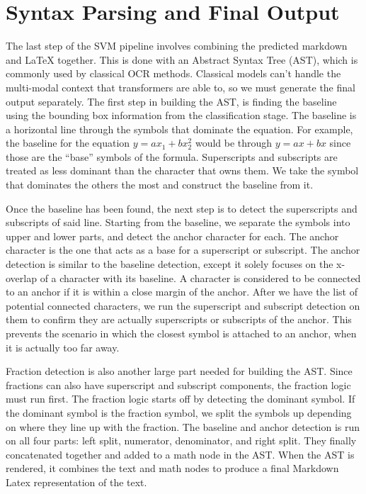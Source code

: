 \documentclass[11pt]{article}
\begin{document}
\section{Syntax Parsing and Final Output}

The last step of the SVM pipeline involves combining the predicted markdown and LaTeX together. This is done with an Abstract Syntax Tree (AST), which is commonly used by classical OCR methods. Classical models can't handle the multi-modal context that transformers are able to, so we must generate the final output separately.
The first step in building the AST, is finding the baseline using the bounding box information from the classification stage. The baseline is a horizontal line through the symbols that dominate the equation. For example, the baseline for the equation $y=ax_{1}+bx_{2}^{2}$ would be through $y=ax+bx$ since those are the ``base'' symbols of the formula. Superscripts and subscripts are treated as less dominant than the character that owns them. We take the symbol that dominates the others the most and construct the baseline from it.

Once the baseline has been found, the next step is to detect the superscripts and subscripts of said line. Starting from the baseline, we separate the symbols into upper and lower parts, and detect the anchor character for each. The anchor character is the one that acts as a base for a superscript or subscript. The anchor detection is similar to the baseline detection, except it solely focuses on the x-overlap of a character with its baseline. A character is considered to be connected to an anchor if it is within a close margin of the anchor. After we have the list of potential connected characters, we run the superscript and subscript detection on them to confirm they are actually superscripts or subscripts of the anchor. This prevents the scenario in which the closest symbol is attached to an anchor, when it is actually too far away.

Fraction detection is also another large part needed for building the AST. Since fractions can also have superscript and subscript components, the fraction logic must run first. The fraction logic starts off by detecting the dominant symbol. If the dominant symbol is the fraction symbol, we split the symbols up depending on where they line up with the fraction. The baseline and anchor detection is run on all four parts: left split, numerator, denominator, and right split. They finally concatenated together and added to a math node in the AST. When the AST is rendered, it combines the text and math nodes to produce a final Markdown Latex representation of the text.
\end{document}

